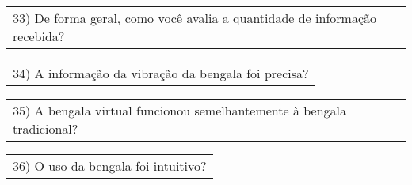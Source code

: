 \begin{table}[!thb]
    
    

    \begin{tabular}{m{1\linewidth}}
        \vspace{1ex}
        33)	De forma geral, como você avalia a quantidade de informação recebida?
    \end{tabular}

    
    

    \begin{tabular}{m{1\linewidth}}
        \vspace{1ex}
        34)	A informação da vibração da bengala foi precisa?
    \end{tabular}

    
    

    \begin{tabular}{m{1\linewidth}}
        \vspace{1ex}
        35)	A bengala virtual funcionou semelhantemente à bengala tradicional?
    \end{tabular}

    
    

    \begin{tabular}{m{1\linewidth}}
        \vspace{1ex}
        36)	O uso da bengala foi intuitivo?
    \end{tabular}

    
    

\end{table}

\FloatBarrier
\pagebreak

